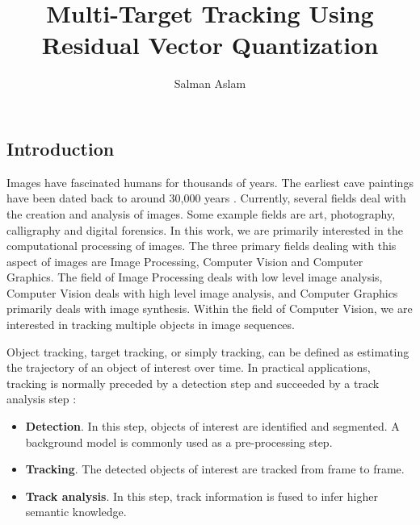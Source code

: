 \documentclass[12pt,letterpaper,doublespaced,ETD,proposal]{gt-ece-thesis}
\title{Multi-Target Tracking Using Residual Vector Quantization}
\author{Salman Aslam}
\begin{document}
	
	\pagestyle{plain}
	

	\begin{FrontMatter}
		\contents %
	\end{FrontMatter}

	\begin{Body}	
		
\section{Introduction}
\label{intro}	
 \par
Images have fascinated humans for thousands of years.  The earliest cave paintings have been dated back to around 30,000 years \cite{2009_WEB_EarliestHumanPaintings_Gray}.  Currently, several fields deal with the creation and analysis of images.  Some example fields are art, photography, calligraphy and digital forensics.  In this work, we are primarily interested in the computational processing of images.  The three primary fields dealing with this aspect of images are Image Processing, Computer Vision and Computer Graphics.  The field of Image Processing deals with low level image analysis, Computer Vision deals with high level image analysis, and Computer Graphics primarily deals with image synthesis.  Within the field of Computer Vision, we are interested in tracking multiple objects in image sequences.

Object tracking, target tracking, or simply tracking, can be defined as estimating the trajectory of an object of interest over time.  In practical applications, tracking is normally preceded by a detection step and succeeded by a track analysis step \cite{2006_JNL_SURVEYtrk_Yilmaz}:

\begin{itemize}
\item \textbf{Detection}.  In this step, objects of interest are identified and segmented.  A background model is commonly used as a pre-processing step.
\item  \textbf{Tracking}.  The detected objects of interest are tracked from frame to frame.  
\item  \textbf{Track analysis}.  In this step, track information is fused to infer higher semantic knowledge.
\end{itemize}


\end{Body}
\end{document}
